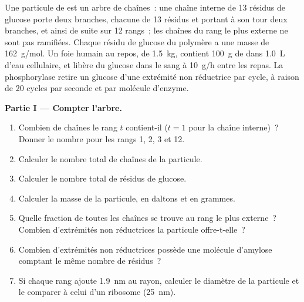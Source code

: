 \begin{problem}
\label{pb:b1:carbohydrates:1}
Une particule de  est un arbre de chaînes~: une chaîne interne
de \qty{13}{} résidus de glucose porte deux branches, chacune de
\qty{13}{} résidus et portant à son tour deux branches, et ainsi de
suite sur \qty{12}{} rangs~; les chaînes du rang le plus externe ne sont
pas ramifiées. Chaque résidu de glucose du polymère a une masse de
\qty{162}{g/mol}. Un foie humain au repos, de \qty{1.5}{kg}, contient
\qty{100}{g} de  dans \qty{1.0}{L} d'eau cellulaire, et libère
du glucose dans le sang à \qty{10}{g/h} entre les repas. La 
phosphorylase retire un glucose d'une extrémité non réductrice par
cycle, à raison de \qty{20}{} cycles par seconde et par molécule
d'enzyme.

\medskip
\noindent\textbf{Partie I --- Compter l'arbre.}
\begin{enumerate}
  \item Combien de chaînes le rang $t$ contient-il ($t = 1$ pour la
        chaîne interne)~? Donner le nombre pour les rangs 1, 2, 3 et 12.
  \item Calculer le nombre total de chaînes de la particule.
  \item Calculer le nombre total de résidus de glucose.
  \item Calculer la masse de la particule, en daltons et en grammes.
  \item Quelle fraction de toutes les chaînes se trouve au rang le plus
        externe~? Combien d'extrémités non réductrices la particule
        offre-t-elle~?
  \item Combien d'extrémités non réductrices possède une molécule
        d'amylose comptant le même nombre de résidus~?
  \item Si chaque rang ajoute \qty{1.9}{nm} au rayon, calculer le
        diamètre de la particule et le comparer à celui d'un ribosome
        (\qty{25}{nm}).
\end{enumerate}


\end{problem}
